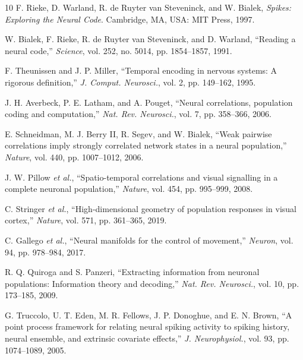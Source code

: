 \documentclass[conference]{IEEEtran}
\begin{document}
\begin{thebibliography}{10}
F. Rieke, D. Warland, R. de Ruyter van Steveninck, and W. Bialek, \emph{Spikes: Exploring the Neural Code}. Cambridge, MA, USA: MIT Press, 1997.

W. Bialek, F. Rieke, R. de Ruyter van Steveninck, and D. Warland, \textquotedblleft Reading a neural code,\textquotedblright{} \emph{Science}, vol. 252, no. 5014, pp. 1854--1857, 1991.

F. Theunissen and J. P. Miller, \textquotedblleft Temporal encoding in nervous systems: A rigorous definition,\textquotedblright{} \emph{J. Comput. Neurosci.}, vol. 2, pp. 149--162, 1995.

J. H. Averbeck, P. E. Latham, and A. Pouget, \textquotedblleft Neural correlations, population coding and computation,\textquotedblright{} \emph{Nat. Rev. Neurosci.}, vol. 7, pp. 358--366, 2006.

E. Schneidman, M. J. Berry II, R. Segev, and W. Bialek, \textquotedblleft Weak pairwise correlations imply strongly correlated network states in a neural population,\textquotedblright{} \emph{Nature}, vol. 440, pp. 1007--1012, 2006.

J. W. Pillow \emph{et al.}, \textquotedblleft Spatio-temporal correlations and visual signalling in a complete neuronal population,\textquotedblright{} \emph{Nature}, vol. 454, pp. 995--999, 2008.

C. Stringer \emph{et al.}, \textquotedblleft High-dimensional geometry of population responses in visual cortex,\textquotedblright{} \emph{Nature}, vol. 571, pp. 361--365, 2019.

C. Gallego \emph{et al.}, \textquotedblleft Neural manifolds for the control of movement,\textquotedblright{} \emph{Neuron}, vol. 94, pp. 978--984, 2017.

R. Q. Quiroga and S. Panzeri, \textquotedblleft Extracting information from neuronal populations: Information theory and decoding,\textquotedblright{} \emph{Nat. Rev. Neurosci.}, vol. 10, pp. 173--185, 2009.

G. Truccolo, U. T. Eden, M. R. Fellows, J. P. Donoghue, and E. N. Brown, \textquotedblleft A point process framework for relating neural spiking activity to spiking history, neural ensemble, and extrinsic covariate effects,\textquotedblright{} \emph{J. Neurophysiol.}, vol. 93, pp. 1074--1089, 2005.
\end{thebibliography}
\end{document}
